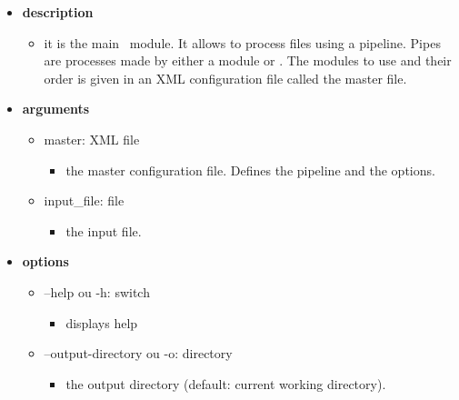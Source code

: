 \documentclass[manual-fr.tex]{subfiles}
\begin{document}
\begin{itemize}
    \item[] \textbf{description}
        \begin{itemize}
            \item[] it is the main \SEM\ module. It allows to process files using a pipeline. Pipes are processes made by either a module or \Wapiti. The modules to use and their order is given in an XML configuration file called the master file.
        \end{itemize}
    \item[] \textbf{arguments}
        \begin{itemize}
            \item[] master: XML file
                \begin{itemize}
                    \item[] the master configuration file. Defines the pipeline and the options.
                \end{itemize}
            \item[] input\_file: file
                \begin{itemize}
                    \item[] the input file.
                \end{itemize}
        \end{itemize}
    \item[] \textbf{options}
        \begin{itemize}
            \item[] --help ou -h: switch
                \begin{itemize}
                    \item[] displays help
                \end{itemize}
            \item[] --output-directory ou -o: directory
                \begin{itemize}
                    \item[] the output directory (default: current working directory).
                \end{itemize}
        \end{itemize}
\end{itemize}
\end{document}
